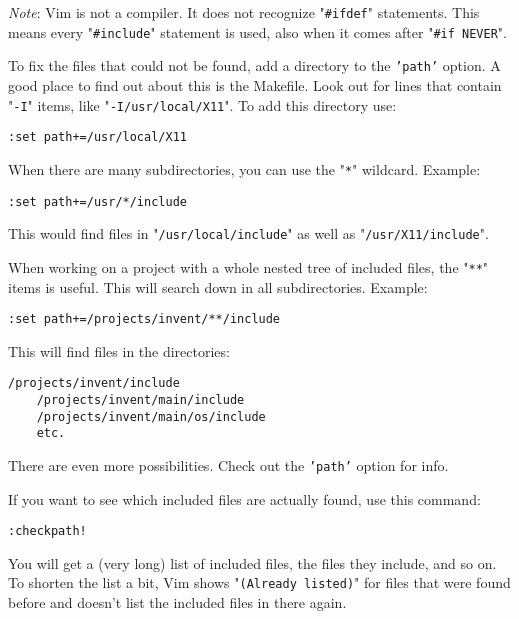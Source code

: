 \emph{Note}:
Vim is not a compiler.
It does not recognize "\texttt{\#ifdef}" statements.
This means every "\texttt{\#include}" statement is used, also when it comes after "\texttt{\#if NEVER}".

To fix the files that could not be found, add a directory to the \texttt{'path'} option.
A good place to find out about this is the Makefile.
Look out for lines that contain "\texttt{-I}" items, like "\texttt{-I/usr/local/X11}".
To add this directory use:

\begin{Verbatim}[samepage=true]
 :set path+=/usr/local/X11
\end{Verbatim}

When there are many subdirectories, you can use the "\texttt{*}" wildcard.
Example:

\begin{Verbatim}[samepage=true]
 :set path+=/usr/*/include
\end{Verbatim}

This would find files in "\texttt{/usr/local/include}" as well as "\texttt{/usr/X11/include}".

When working on a project with a whole nested tree of included files, the "\texttt{**}" items is useful.
This will search down in all subdirectories.
Example:

\begin{Verbatim}[samepage=true]
 :set path+=/projects/invent/**/include
\end{Verbatim}

This will find files in the directories:

\begin{Verbatim}[samepage=true]
    /projects/invent/include 
    /projects/invent/main/include 
    /projects/invent/main/os/include 
    etc.
\end{Verbatim}

There are even more possibilities.
Check out the \texttt{'path'} option for info.

If you want to see which included files are actually found, use this command:

\begin{Verbatim}[samepage=true]
 :checkpath!
\end{Verbatim}

You will get a (very long) list of included files, the files they include, and so on.
To shorten the list a bit, Vim shows "\texttt{(Already listed)}" for files that were found before and doesn't list the included files in there again.

